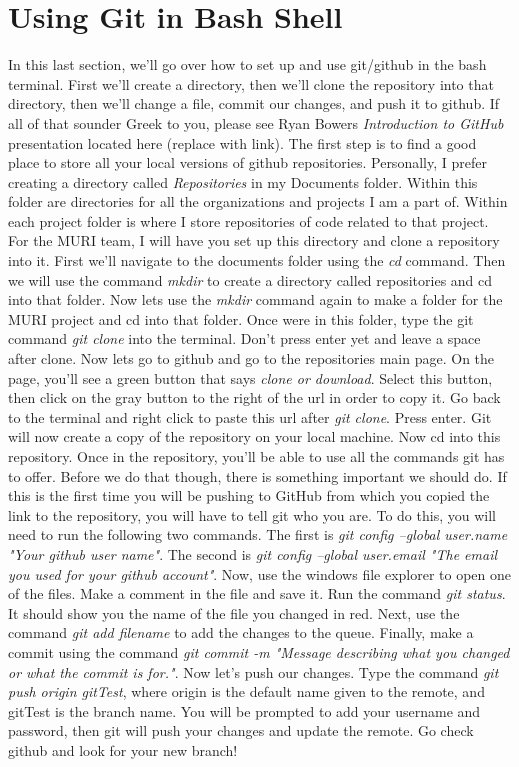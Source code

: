 \documentclass{article}
\begin{document}
\section{Using Git in Bash Shell}
In this last section, we'll go over how to set up and use git/github in the bash terminal. First we'll create a directory, then we'll clone the repository into that directory, then we'll change a file, commit our changes, and push it to github. If all of that sounder Greek to you, please see Ryan Bowers \emph{Introduction to GitHub} presentation located here (replace with link). The first step is to find a good place to store all your local versions of github repositories. Personally, I prefer creating a directory called \emph{Repositories} in my Documents folder. Within this folder are directories for all the organizations and projects I am a part of. Within each project folder is where I store repositories of code related to that project. For the MURI team, I will have you set up this directory and clone a repository into it. First we'll navigate to the documents folder using the \emph{cd} command. Then we will use the command \emph{mkdir} to create a directory called repositories and cd into that folder. Now lets use the \emph{mkdir} command again to make a folder for the MURI project and cd into that folder. Once were in this folder, type the git command \emph{git clone} into the terminal. Don't press enter yet and leave a space after clone. Now lets go to github and go to the repositories main page. On the page, you'll see a green button that says \emph{clone or download}. Select this button, then click on the gray button to the right of the url in order to copy it. Go back to the terminal and right click to paste this url after \emph{git clone}. Press enter. Git will now create a copy of the repository on your local machine. Now cd into this repository. Once in the repository, you'll be able to use all the commands git has to offer. Before we do that though, there is something important we should do. If this is the first time you will be pushing to GitHub from which you copied the link to the repository, you will have to tell git who you are. To do this, you will need to run the following two commands. The first is \emph{git config --global user.name "Your github user name"}. The second is \emph{git config --global user.email "The email you used for your github account"}. Now, use the windows file explorer to open one of the files. Make a comment in the file and save it. Run the command \emph{git status}. It should show you the name of the file you changed in red. Next, use the command \emph{git add filename} to add the changes to the queue. Finally, make a commit using the command \emph{git commit -m "Message describing what you changed or what the commit is for."}. Now let's push our changes. Type the command \emph{git push origin gitTest}, where origin is the default name given to the remote, and gitTest is the branch name. You will be prompted to add your username and password, then git will push your changes and update the remote. Go check github and look for your new branch!
\end{document}
